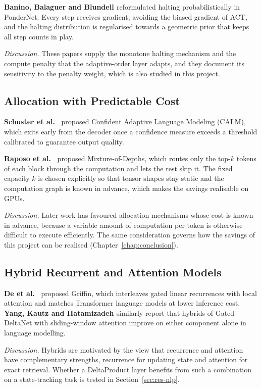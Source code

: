 \textbf{Banino, Balaguer and Blundell \cite{pondernet}} reformulated halting probabilistically in PonderNet. Every step receives gradient, avoiding the biased gradient of ACT, and the halting distribution is regularised towards a geometric prior that keeps all step counts in play.

\textit{Discussion.} These papers supply the monotone halting mechanism and the compute penalty that the adaptive-order layer adapts, and they document its sensitivity to the penalty weight, which is also studied in this project.

\subsection{Allocation with Predictable Cost}
\textbf{Schuster et al.\ \cite{calm}} proposed Confident Adaptive Language Modeling (CALM), which exits early from the decoder once a confidence measure exceeds a threshold calibrated to guarantee output quality.

\textbf{Raposo et al.\ \cite{mod}} proposed Mixture-of-Depths, which routes only the top-$k$ tokens of each block through the computation and lets the rest skip it. The fixed capacity $k$ is chosen explicitly so that tensor shapes stay static and the computation graph is known in advance, which makes the savings realisable on GPUs.

\textit{Discussion.} Later work has favoured allocation mechanisms whose cost is known in advance, because a variable amount of computation per token is otherwise difficult to execute efficiently. The same consideration governs how the savings of this project can be realised (Chapter~\ref{chap:conclusion}).

\subsection{Hybrid Recurrent and Attention Models}
\textbf{De et al.\ \cite{griffin}} proposed Griffin, which interleaves gated linear recurrences with local attention and matches Transformer language models at lower inference cost. \textbf{Yang, Kautz and Hatamizadeh \cite{gateddeltanet}} similarly report that hybrids of Gated DeltaNet with sliding-window attention improve on either component alone in language modelling.

\textit{Discussion.} Hybrids are motivated by the view that recurrence and attention have complementary strengths, recurrence for updating state and attention for exact retrieval. Whether a DeltaProduct layer benefits from such a combination on a state-tracking task is tested in Section~\ref{sec:res-nlp}.

